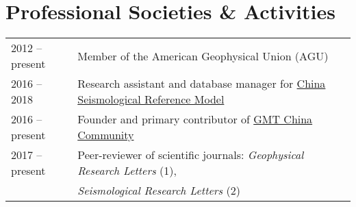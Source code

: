 \section*{Professional Societies \& Activities}

\begin{tabular}{ll}
2012 -- present & Member of the American Geophysical Union (AGU) \\
2016 -- 2018    & Research assistant and database manager for \href{http://chinageorefmodel.org/}{China Seismological Reference Model} \\
2016 -- present & Founder and primary contributor of \href{http://gmt-china.org/}{GMT China Community} \\
2017 -- present & Peer-reviewer of scientific journals: \textit{Geophysical Research Letters} (1), \\
				& 										\textit{Seismological Research Letters} (2) \\
\end{tabular}
